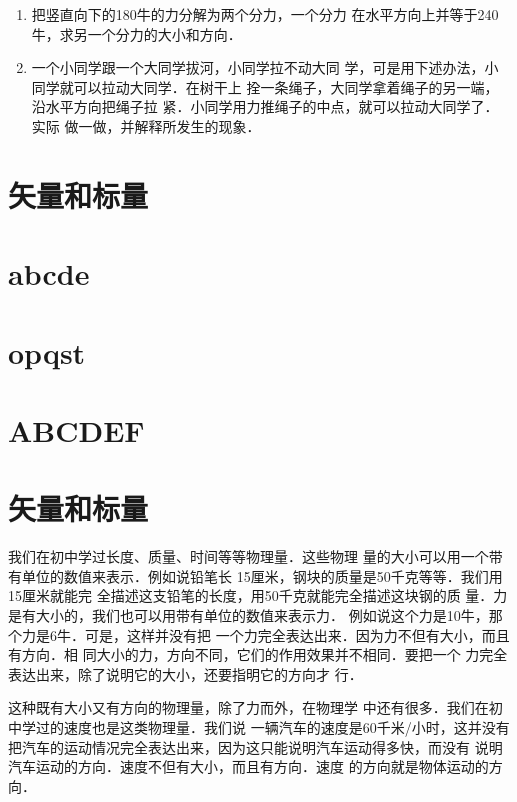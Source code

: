 \begin{Project}
\begin{enumerate}
\item 把竖直向下的180牛的力分解为两个分力，一个分力
在水平方向上并等于240牛，求另一个分力的大小和方向．

\item 一个小同学跟一个大同学拔河，小同学拉不动大同
学，可是用下述办法，小同学就可以拉动大同学．在树干上
拴一条绳子，大同学拿着绳子的另一端，沿水平方向把绳子拉
紧．小同学用力推绳子的中点，就可以拉动大同学了．实际
做一做，并解释所发生的现象．

\end{enumerate}


\end{Project}







\section{矢量和标量}

\section{abcde}

\section{opqst}

\section{ABCDEF}


\section{矢量和标量}
    我们在初中学过长度、质量、时间等等物理量．这些物理
量的大小可以用一个带有单位的数值来表示．例如说铅笔长
15厘米，钢块的质量是50千克等等．我们用15厘米就能完
全描述这支铅笔的长度，用50千克就能完全描述这块钢的质
量．力是有大小的，我们也可以用带有单位的数值来表示力．
例如说这个力是10牛，那个力是6牛．可是，这样并没有把
一个力完全表达出来．因为力不但有大小，而且有方向．相
同大小的力，方向不同，它们的作用效果并不相同．要把一个
力完全表达出来，除了说明它的大小，还要指明它的方向才
行．

    这种既有大小又有方向的物理量，除了力而外，在物理学
中还有很多．我们在初中学过的速度也是这类物理量．我们说
一辆汽车的速度是60千米/小时，这并没有把汽车的运动情况完全表达出来，因为这只能说明汽车运动得多快，而没有
说明汽车运动的方向．速度不但有大小，而且有方向．速度
的方向就是物体运动的方向．

